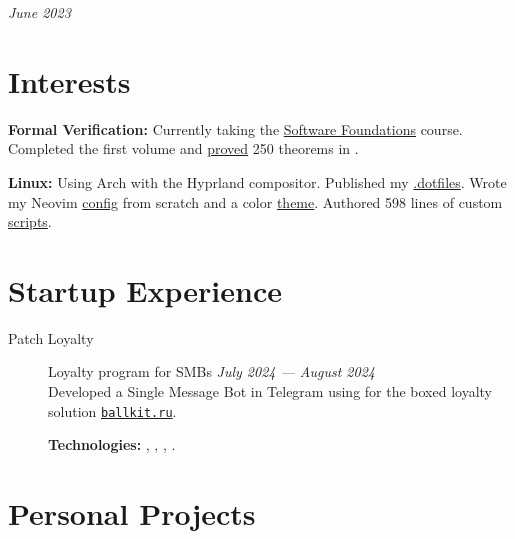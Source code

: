 \documentclass[margin,line]{resume}
\begin{document}
\begin{resume}
  \hfill \textsl{June 2023}
  \vspace{-4mm}
  \section{\mysidestyle Interests}\vspace{0.7mm}

  {\textbf{Formal Verification:} Currently taking the
    \href{https://softwarefoundations.cis.upenn.edu}{Software
    Foundations} course. Completed the first volume and
    \href{https://github.com/alchemmist/coq-learning}{proved} 250
  theorems in .} \\

  \vspace{-6mm}

  \textbf{Linux:} Using Arch with the Hyprland compositor. Published
  my \href{https:/github.com/alchemmist/.dotfiles}{.dotfiles}. Wrote
  my Neovim
  \href{https://github.com/alchemmist/.dotfiles/tree/main/nvim}{config}
  from scratch and a color
  \href{https://github.com/alchemmist/nothing.nvim}{theme}. Authored
  598 lines of custom
  \href{https://github.com/alchemmist/.dotfiles/tree/main/scripts}{scripts}.

  \vfill

  \section{\mysidestyle Startup Experience}\vspace{2mm}

  \begin{description}

    \item[Patch Loyalty]\small Loyalty program for SMBs \hfill
      \textsl{July 2024 — August 2024}\vspace{1mm}\\
      Developed a Single Message Bot in Telegram using
       for the boxed loyalty solution
      \href{https://ballkit.ru}{\texttt{ballkit.ru}}.

      \textbf{Technologies:}
      ,
      , ,
      .
  \end{description}

  \section{\mysidestyle Personal Projects}\vspace{2mm}


\end{resume}
\end{document}
